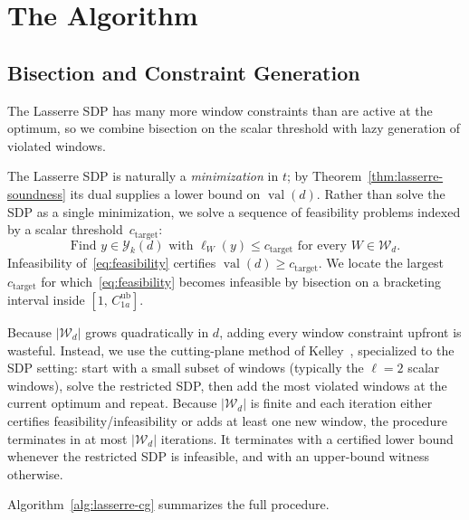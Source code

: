 \documentclass[11pt, letterpaper]{article}
\theoremstyle{paperplain}
\theoremstyle{paperdef}
\newcommand{\val}{\operatorname{val}}
\begin{document}
\section{The Algorithm}\label{sec:algorithm}

\subsection{Bisection and Constraint Generation}

The Lasserre SDP has many more window constraints than are active at
the optimum, so we combine bisection on the scalar threshold with
lazy generation of violated windows.

The Lasserre SDP is naturally a \emph{minimization} in $t$; by
Theorem~\ref{thm:lasserre-soundness} its dual supplies a lower bound
on $\val(d)$.  Rather than solve the SDP as a single minimization, we
solve a sequence of feasibility problems indexed by a scalar
threshold~$c_{\mathrm{target}}$:
\begin{equation}\label{eq:feasibility}
  \text{Find } y\in\mathcal{Y}_k(d)\text{ with }
  \ell_W(y) \le c_{\mathrm{target}}\text{ for every }W\in\mathcal{W}_d.
\end{equation}
Infeasibility of~\eqref{eq:feasibility} certifies
$\val(d)\ge c_{\mathrm{target}}$.  We locate the largest
$c_{\mathrm{target}}$ for which~\eqref{eq:feasibility} becomes
infeasible by bisection on a bracketing interval inside
$[1,\,C_{1a}^{\mathrm{ub}}]$.

Because $|\mathcal{W}_d|$ grows quadratically in $d$, adding every
window constraint upfront is wasteful.  Instead, we use the
cutting-plane method of Kelley~\cite{Kelley1960}, specialized to the
SDP setting: start with a small subset of windows (typically the
$\ell=2$ scalar windows), solve the restricted SDP, then add the
most violated windows at the current optimum and repeat.  Because
$|\mathcal{W}_d|$ is finite and each iteration either certifies
feasibility/infeasibility or adds at least one new window, the
procedure terminates in at most $|\mathcal{W}_d|$ iterations.  It
terminates with a certified lower bound whenever the restricted SDP
is infeasible, and with an upper-bound witness otherwise.

Algorithm~\ref{alg:lasserre-cg} summarizes the full procedure.
\end{document}
